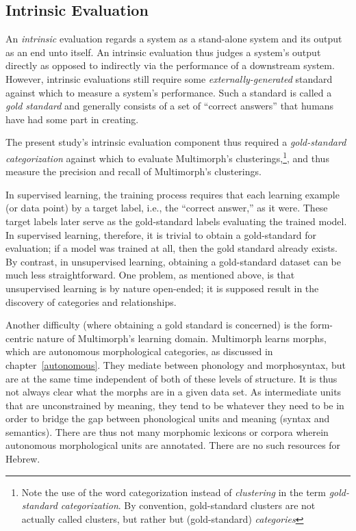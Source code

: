 \subsection{Intrinsic Evaluation}
\label{sec:intrinsic}
An \emph{intrinsic} evaluation regards a system as a stand-alone system and its output as an end unto itself. An intrinsic evaluation thus judges a system's output directly as opposed to indirectly via the performance of a downstream system. However, intrinsic evaluations still require some \emph{externally-generated} standard against which to measure a system's performance. Such a standard is called a \emph{gold standard} and generally consists of a set of ``correct answers'' that humans have had some part in creating.

The present study's intrinsic evaluation component thus required a \emph{gold-standard categorization} against which to evaluate Multimorph's clusterings,\footnote{Note the use of the word {categorization} instead of \emph{clustering} in the term \emph{gold-standard categorization}. 
By convention, gold-standard clusters are not actually called clusters, but rather 
but (gold-standard) \emph{categories}}, and thus measure the precision and recall of Multimorph's clusterings. 

In supervised learning, the training process requires that each learning example (or data point) by a target label, i.e., the ``correct answer,'' as it were. %
 These target labels later serve as the gold-standard labels evaluating the trained model. In supervised learning, therefore, it is trivial to obtain a gold-standard for evaluation; if a model was trained at all, then the gold standard already exists. By contrast, in unsupervised learning, obtaining a gold-standard dataset can be much less straightforward. One problem, as mentioned above, is that unsupervised learning is by nature open-ended; it is supposed result in the discovery of categories and relationships.  

Another difficulty (where obtaining a gold standard is concerned) is the 
form-centric nature of Multimorph's learning domain. Multimorph learns morphs, 
which are autonomous morphological categories, as discussed in chapter~\ref{autonomous}. 
They mediate between phonology and morphosyntax, but are at the same time independent 
of both of these levels of structure. It is thus not always clear what the morphs are in a 
given data set. As intermediate units that are unconstrained by meaning, they tend 
to be whatever they need to be in order to bridge the gap between phonological units 
and meaning (syntax and semantics).  There are thus not many morphomic lexicons 
or corpora wherein autonomous morphological units are annotated. There are no 
such resources for Hebrew.

